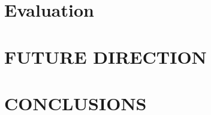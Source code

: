 \documentclass[letterpaper, 10 pt, conference]{ieeeconf}  %
\begin{document}
\section{Evaluation}\label{sec:eval}

\section{FUTURE DIRECTION}\label{sec:fd}

\section{CONCLUSIONS}\label{sec:c}




\addtolength{\textheight}{-12cm}  


\end{document}
